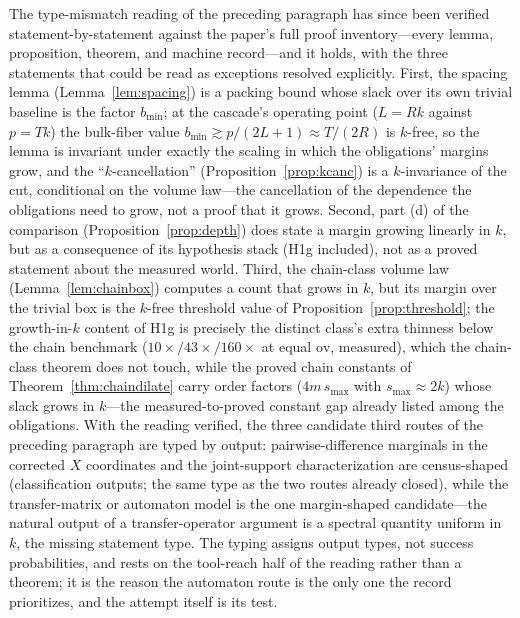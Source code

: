 \documentclass[11pt,a4paper]{article}
\numberwithin{equation}{section}
\theoremstyle{plain}
\theoremstyle{definition}
\theoremstyle{remark}
\begin{document}
The type-mismatch reading of the preceding paragraph has since been
verified statement-by-statement against the paper's full proof
inventory---every lemma, proposition, theorem, and machine record---and
it holds, with the three statements that could be read as exceptions
resolved explicitly. First, the spacing lemma (Lemma~\ref{lem:spacing})
is a packing bound whose slack over its own trivial baseline is the
factor $b_{\min}$; at the cascade's operating point ($L=Rk$ against
$p=Tk$) the bulk-fiber value $b_{\min}\gtrsim p/(2L+1)\approx T/(2R)$ is
$k$-free, so the lemma is invariant under exactly the scaling in which
the obligations' margins grow, and the ``$k$-cancellation''
(Proposition~\ref{prop:kcanc}) is a $k$-invariance of the cut,
conditional on the volume law---the cancellation of the dependence the
obligations need to grow, not a proof that it grows. Second, part (d) of
the comparison (Proposition~\ref{prop:depth}) does state a margin
growing linearly in $k$, but as a consequence of its hypothesis stack
(H1g included), not as a proved statement about the measured world.
Third, the chain-class volume law (Lemma~\ref{lem:chainbox}) computes a
count that grows in $k$, but its margin over the trivial box is the
$k$-free threshold value of Proposition~\ref{prop:threshold}; the
growth-in-$k$ content of H1g is precisely the distinct class's extra
thinness below the chain benchmark ($10\times/43\times/160\times$ at
equal $\mathrm{ov}$, measured), which the chain-class theorem does not
touch, while the proved chain constants of Theorem~\ref{thm:chaindilate}
carry order factors ($4m\,s_{\max}$ with $s_{\max}\approx2k$) whose
slack grows in $k$---the measured-to-proved constant gap already listed
among the obligations. With the reading verified, the three candidate
third routes of the preceding paragraph are typed by output:
pairwise-difference marginals in the corrected $X$ coordinates and the
joint-support characterization are census-shaped (classification
outputs; the same type as the two routes already closed), while the
transfer-matrix or automaton model is the one margin-shaped
candidate---the natural output of a transfer-operator argument is a
spectral quantity uniform in $k$, the missing statement type. The typing
assigns output types, not success probabilities, and rests on the
tool-reach half of the reading rather than a theorem; it is the reason
the automaton route is the only one the record prioritizes, and the
attempt itself is its test.
\end{document}
